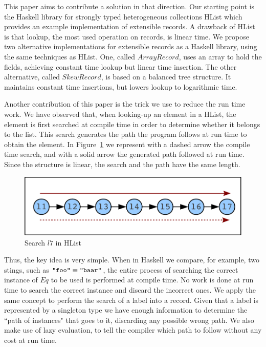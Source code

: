 \documentclass[natbib]{sigplanconf}
\newcommand{\bruno}[1]{\textcolor{red}{\textbf{Bruno:}#1}}
\newcommand{\marcos}[1]{\textcolor{red}{\textbf{Marcos:}#1}}
\renewcommand{\bruno}[1]{}
\renewcommand{\marcos}[1]{}
\newcommand{\Conid}[1]{\mathit{#1}}
\newcommand{\Varid}[1]{\mathit{#1}}
\begin{document}
This paper aims to contribute a solution in that direction. 
Our starting point is the Haskell library for strongly typed heterogeneous collections HList \cite{KLS04}
which provides an example implementation of extensible records. 
A drawback of HList is that lookup, the most used operation on records, is linear time.
We propose two alternative implementations for extensible records as a Haskell library, using the same techniques as HList.
One, called \ensuremath{\Conid{ArrayRecord}}, uses an array to hold the fields, achieving constant time lookup but linear time insertion.
The other alternative, called \ensuremath{\Conid{SkewRecord}}, is based on a balanced tree structure. It maintains constant time insertions, but lowers lookup to logarithmic time.

Another contribution of this paper is the trick we use to reduce the run time work.
We have observed that, when looking-up an element in a HList,
the element is first searched at compile time in order to determine whether it
belongs to the list.
This search generates the path the program follows at run time to obtain the element.
In Figure~\ref{fig:search-hlist} we represent with a dashed arrow the compile time search, 
and with a solid arrow the generated path followed at run time. 
Since the structure is linear, the search and the path have the same length.

\begin{figure}[tp]
\begin{center}
\includegraphics[scale=0.5]{search-hlist.pdf}
\end{center}
\caption{Search \ensuremath{\Varid{l7}} in HList} \label{fig:search-hlist}
\end{figure}

Thus, the key idea is very simple. When in Haskell we compare, for example, two stings, such as \ensuremath{\text{\tt \char34 foo\char34}\equiv \text{\tt \char34 baar\char34}}, the entire process of searching the correct instance of \ensuremath{\Conid{Eq}} to be used is performed at compile time. No work is done at run time to search the correct instance and discard the incorrect ones. We apply the same concept to perform the search of a label into a record. Given that a label is represented by a singleton type we have enough information to determine the ``path of instances" that goes to it, discarding any possible wrong path.
We also make use of lazy evaluation, to tell the compiler which path to follow without any cost at run time.
\end{document}
